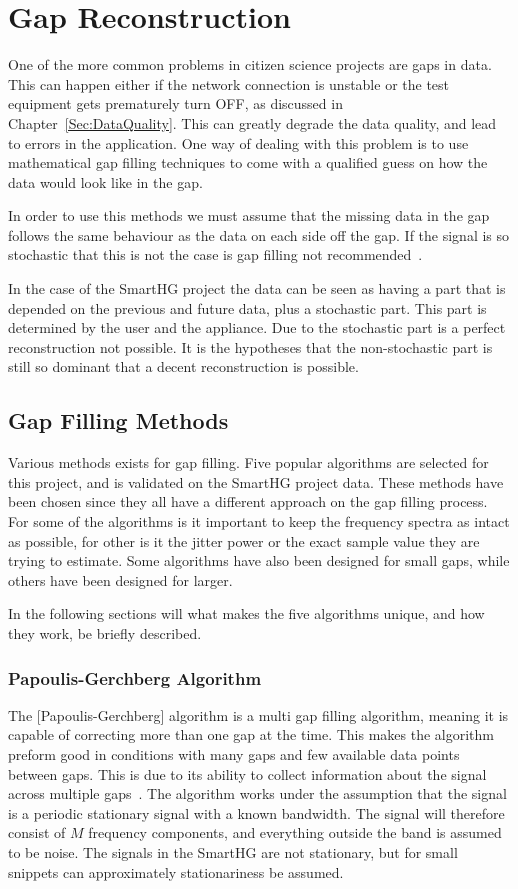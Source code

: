 \chapter{Gap Reconstruction}
\label{Sec:GapFill}
One of the more common problems in citizen science projects are gaps in data. This can happen either if the network connection is unstable or the test equipment gets prematurely turn OFF, as discussed in Chapter~\ref{Sec:DataQuality}. This can greatly degrade the data quality, and lead to errors in the application. One way of dealing with this problem is to use mathematical gap filling techniques to come with a qualified guess on how the data would look like in the gap. 

In order to use this methods we must assume that the missing data in the gap follows the same behaviour as the data on each side off the gap. If the signal is so stochastic that this is not the case is gap filling not recommended~\citep{RefWorks:10}. 

In the case of the SmartHG project the data can be seen as having a part that is depended on the previous and future data, plus a stochastic part. This part is determined by the user and the appliance. Due to the stochastic part is a perfect reconstruction not possible. It is the hypotheses that the non-stochastic part is still so dominant that a decent reconstruction is possible.

\section{Gap Filling Methods}
\label{T:GapFilling}
Various methods exists for gap filling. Five popular algorithms are selected for this project, and is validated on the SmartHG project data. These methods have been chosen since they all have a different approach on the gap filling process. For some of the algorithms is it important to keep the frequency spectra as intact as possible, for other is it the jitter power or the exact sample value they are trying to estimate. Some algorithms have also been designed for small gaps, while others have been designed for larger. 

In the following sections will what makes the five algorithms unique, and how they work, be briefly described.

\subsection{Papoulis-Gerchberg Algorithm}
\label{T:PGA}
The [Papoulis-Gerchberg] algorithm is a multi gap filling algorithm, meaning it is capable of correcting more than one gap at the time. This makes the algorithm preform good in conditions with many gaps and few available data points between gaps. This is due to its ability to collect information about the signal across multiple gaps~\citep{RefWorks:11}. The  algorithm works under the assumption that the signal is a periodic stationary signal with a known bandwidth. The signal will therefore consist of $M$ frequency components, and everything outside the band is assumed to be noise. The signals in the SmartHG are not stationary, but for small snippets can approximately stationariness be assumed. 

